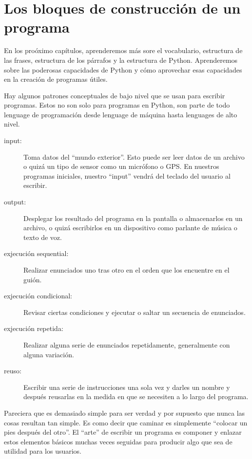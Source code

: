 \section{Los bloques de construcci\'on de un programa}

En los pro\'oximo cap\'itulos, aprenderemos m\'as sore el vocabulario, estructura de las frases, estructura de los p\'arrafos y la estructura de Python. Aprenderemos sobre las poderosas capacidades de Python y c\'omo aprovechar esas capacidades en la creaci\'on de programas \'utiles.

Hay algunos patrones conceptuales de bajo nivel que se usan para escribir programas. Estos no son solo para programas en Python, son parte de todo lenguage de programaci\'on desde lenguage de m\'aquina hasta lenguages de alto nivel.

\begin{description}

\item[input:] Toma datos del ``mundo exterior''. Esto puede ser leer datos de un archivo o quiz\'a un tipo de sensor como un micr\'ofono o GPS. En nuestros programas iniciales, nuestro ``input'' vendr\'a del teclado del usuario al escribir.

\item[output:] Desplegar los resultado del programa en la pantalla o almacenarlos en un archivo, o quiz\'a escribirlos en un dispositivo como parlante de m\'usica o texto de voz.

\item[exjecuci\'on sequential:] Realizar enunciados uno tras otro en el orden que los encuentre en el gui\'on.

\item[exjecuci\'on condicional:] Revisar ciertas condiciones y ejecutar o saltar un secuencia de enunciados.

\item[exjecuci\'on repetida:] Realizar alguna serie de enunciados repetidamente, generalmente con alguna variaci\'on.

\item[reuso:] Escribir una serie de instrucciones una sola vez y darles un nombre y despu\'es reusarlas en la medida en que se necesiten a lo largo del programa.

\end{description}

Pareciera que es demasiado simple para ser verdad y por supuesto que nunca las cosas resultan tan simple. Es como decir que caminar es simplemente
``colocar un pies despu\'es del otro''. El ``arte'' 
de escribir un programa es componer y enlazar estos elementos b\'asicos muchas veces seguidas para producir algo que sea de utilidad para los usuarios.

